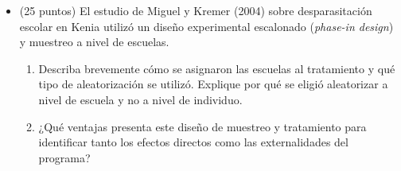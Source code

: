 \documentclass[10pt,a4paper]{article}
\begin{document}
\begin{enumerate}
\begin{itemize}
\[
(\bar{X} - \bar{Y}) \pm z_{\alpha/2} \cdot \sqrt{ \frac{\sigma_x^2}{n_x} + \frac{\sigma_y^2}{n_y} }
\]

\subsection*{Datos}

\begin{itemize}
    \item \( \bar{X} = 2800 \), \( \sigma_x = 400 \), \( n_x = 150 \)
    \item \( \bar{Y} = 2600 \), \( \sigma_y = 500 \), \( n_y = 180 \)
    \item Nivel de confianza = 90\% → \( \alpha = 0{,}10 \) → \( z_{\alpha/2} \approx 1{,}645 \)
\end{itemize}

\subsection*{Cálculo}

\[
= (2800 - 2600) \pm 1{,}645 \cdot \sqrt{ \frac{400^2}{150} + \frac{500^2}{180} }
\]

\[
= 200 \pm 1{,}645 \cdot \sqrt{1066{,}67 + 1388{,}89}
= 200 \pm 1{,}645 \cdot \sqrt{2455{,}56}
\]

\[
= 200 \pm 1{,}645 \cdot 49{,}55 \approx 200 \pm 81{,}52
\]

\[
\Rightarrow \text{Intervalo: } [118{,}48,\ 281{,}52]
\]

\subsection*{Conclusión}

Con un 90\% de confianza, la diferencia en los salarios promedio entre ambos sectores está entre \$118,48 y \$281,52.  
Dado que el valor 0 no está dentro del intervalo, concluimos que existe una diferencia significativa en los salarios promedio mensuales entre el sector administrativo y el sector técnico.

\newpage
    \item (25 puntos) El estudio de Miguel y Kremer (2004) sobre desparasitación escolar en Kenia utilizó un diseño experimental escalonado (\textit{phase-in design}) y muestreo a nivel de escuelas.

\begin{enumerate}
    \item Describa brevemente cómo se asignaron las escuelas al tratamiento y qué tipo de aleatorización se utilizó. Explique por qué se eligió aleatorizar a nivel de escuela y no a nivel de individuo. 
    \item ¿Qué ventajas presenta este diseño de muestreo y tratamiento para identificar tanto los efectos directos como las externalidades del programa?
\end{enumerate}
    

\end{itemize}
\end{enumerate}
\end{document}
